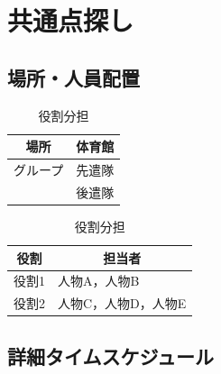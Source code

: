 \section{共通点探し}  %

\subsection{場所・人員配置}
\begin{table}[h]
  \centering
  \begin{minipage}[t]{0.48\columnwidth}
    \centering
    \caption{場所・該当グループ}
    \begin{tabular}{cl}
      \hline
      場所 & 体育館 \\
      \hline
      グループ & 先遣隊 \\
       & 後遣隊 \\
      \hline
    \end{tabular}
  \end{minipage}
  \begin{minipage}[t]{0.48\columnwidth}
    \centering
    \caption{役割分担}
    \begin{tabular}{ll}
      \hline
      \multicolumn{1}{c}{役割} & \multicolumn{1}{c}{担当者} \\
      \hline
      役割1 & 人物A，人物B \\
      役割2 & 人物C，人物D，人物E \\
      \hline
    \end{tabular}
  \end{minipage}
\end{table}

\subsection{詳細タイムスケジュール}
\vspace{0.5em}
\fontsize{8pt}{12pt}\selectfont

